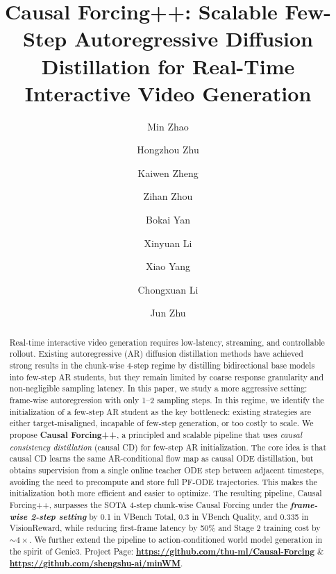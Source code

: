\documentclass{llmxive}
\title{Causal Forcing+{}+: Scalable Few-Step Autoregressive Diffusion Distillation for Real-Time Interactive Video Generation}
\author{Min Zhao \and Hongzhou Zhu \and Kaiwen Zheng \and Zihan Zhou \and Bokai Yan \and Xinyuan Li \and Xiao Yang \and Chongxuan Li \and Jun Zhu}
\providecommand{\ours}{Causal Forcing++\xspace}
\begin{document}
\maketitle
\begin{abstract}
Real-time interactive video generation requires low-latency, streaming, and controllable rollout. Existing autoregressive (AR) diffusion distillation methods have achieved strong results in the chunk-wise 4-step regime by distilling bidirectional base models into few-step AR students, but they remain limited by coarse response granularity and non-negligible sampling latency. In this paper, we study a more aggressive setting: frame-wise autoregression with only 1--2 sampling steps. In this regime, we identify the initialization of a few-step AR student as the key bottleneck: existing strategies are either target-misaligned, incapable of few-step generation, or too costly to scale. We propose \textbf{Causal Forcing++}, a principled and scalable pipeline that uses \emph{causal consistency distillation} (causal CD) for few-step AR initialization. The core idea is that causal CD learns the same AR-conditional flow map as causal ODE distillation, but obtains supervision from a single online teacher ODE step between adjacent timesteps, avoiding the need to precompute and store full PF-ODE trajectories. This makes the initialization both more efficient and easier to optimize. The resulting pipeline, \ours, surpasses the SOTA 4-step chunk-wise Causal Forcing under the \textit{\textbf{frame-wise 2-step setting}} by 0.1 in VBench Total, 0.3 in VBench Quality, and 0.335 in VisionReward, while reducing first-frame latency by 50\% and Stage 2 training cost by $\sim$$4\times$. We further extend the pipeline to action-conditioned world model generation in the spirit of Genie3.
Project Page: \textbf{\href{https://github.com/thu-ml/Causal-Forcing}{https://github.com/thu-ml/Causal-Forcing}} \& \textbf{\href{https://github.com/shengshu-ai/minWM}{https://github.com/shengshu-ai/minWM}}.
\end{abstract}
\end{document}
